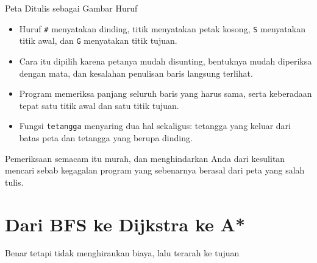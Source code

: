 \documentclass[aspectratio=169,10pt]{beamer}
\begin{document}
\begin{frame}{Peta Ditulis sebagai Gambar Huruf}
\begin{itemize}
  \item Huruf \texttt{\#} menyatakan dinding, titik menyatakan petak kosong,
        \texttt{S} menyatakan titik awal, dan \texttt{G} menyatakan titik
        tujuan.
  \item Cara itu dipilih karena petanya mudah disunting, bentuknya mudah
        diperiksa dengan mata, dan kesalahan penulisan baris langsung terlihat.
  \item Program memeriksa panjang seluruh baris yang harus sama, serta
        keberadaan tepat satu titik awal dan satu titik tujuan.
  \item Fungsi \texttt{tetangga} menyaring dua hal sekaligus: tetangga yang
        keluar dari batas peta dan tetangga yang berupa dinding.
\end{itemize}
\vspace{0.12cm}
\begin{kotak}
Pemeriksaan semacam itu murah, dan menghindarkan Anda dari kesulitan mencari
sebab kegagalan program yang sebenarnya berasal dari peta yang salah tulis.
\end{kotak}
\end{frame}

\section{Dari BFS ke Dijkstra ke A*}
  {Benar tetapi tidak menghiraukan biaya, lalu terarah ke tujuan}
\end{document}
